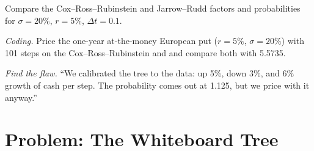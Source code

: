 \begin{exercise}[$\star\star$]\label{exo:dv:the-binomial-model:6}
Compare the Cox--Ross--Rubinstein and Jarrow--Rudd factors and probabilities for
$\sigma=20\%$, $r=5\%$, $\Delta t=0.1$.
\end{exercise}

\begin{exercise}[$\star\star\star$]\label{exo:dv:the-binomial-model:7}
\emph{Coding.} Price the one-year at-the-money European put ($r=5\%$,
$\sigma=20\%$) with 101 steps on the Cox--Ross--Rubinstein and  and compare both with 5.5735.
\end{exercise}

\begin{exercise}[$\star\star\star$]\label{exo:dv:the-binomial-model:8}
\emph{Find the flaw.} ``We calibrated the tree to the data: up 5\%, down 3\%, and
6\% growth of cash per step. The probability comes out at 1.125, but we price
with it anyway.''
\end{exercise}

\section{Problem: The Whiteboard Tree}

